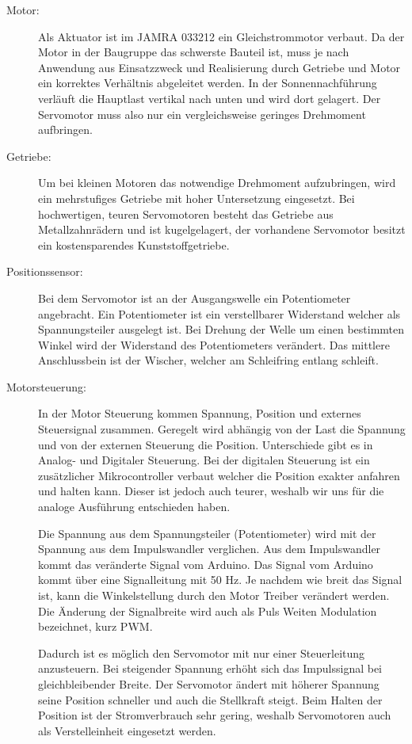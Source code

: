 \begin{description}
  \item[Motor:] Als Aktuator ist im JAMRA 033212 ein Gleichstrommotor verbaut. Da der Motor in der Baugruppe das schwerste Bauteil ist, muss je nach Anwendung aus Einsatzzweck und Realisierung durch Getriebe und Motor ein korrektes Verhältnis abgeleitet werden. In der Sonnennachführung verläuft die Hauptlast vertikal nach unten und wird dort gelagert. Der Servomotor muss also nur ein vergleichsweise geringes Drehmoment aufbringen.

  \item[Getriebe:] Um bei kleinen Motoren das notwendige Drehmoment aufzubringen, wird ein mehrstufiges Getriebe mit hoher Untersetzung eingesetzt. Bei hochwertigen, teuren Servomotoren besteht das Getriebe aus Metallzahnrädern und ist kugelgelagert, der vorhandene Servomotor besitzt ein kostensparendes Kunststoffgetriebe.

  \item[Positionssensor:] Bei dem Servomotor ist an der Ausgangswelle ein Potentiometer angebracht. Ein Potentiometer ist ein verstellbarer Widerstand welcher als Spannungsteiler ausgelegt ist.  Bei Drehung der Welle um einen bestimmten Winkel wird der Widerstand des Potentiometers verändert. Das mittlere Anschlussbein ist der Wischer, welcher am Schleifring entlang schleift. 

  \item [Motorsteuerung:] In der Motor Steuerung kommen Spannung, Position und externes Steuersignal zusammen. Geregelt wird abhängig von der Last die Spannung und von der externen Steuerung die Position. Unterschiede gibt es in Analog- und Digitaler Steuerung. Bei der digitalen Steuerung ist ein zusätzlicher Mikrocontroller verbaut welcher die Position exakter anfahren und halten kann. Dieser ist jedoch auch teurer, weshalb wir uns für die analoge Ausführung entschieden haben.
  
  Die Spannung aus dem Spannungsteiler (Potentiometer) wird mit der Spannung aus dem Impulswandler verglichen. Aus dem Impulswandler kommt das veränderte Signal vom Arduino. Das Signal vom Arduino kommt über eine Signalleitung mit 50 Hz. Je nachdem wie breit das Signal ist, kann die Winkelstellung durch den Motor Treiber verändert werden. Die Änderung der Signalbreite wird auch als Puls Weiten Modulation bezeichnet, kurz PWM. \cite{Dejan:2018,Ibrahim:2018}
  
  Dadurch ist es möglich den Servomotor mit nur einer Steuerleitung anzusteuern. Bei steigender Spannung erhöht sich das Impulssignal bei gleichbleibender Breite. Der Servomotor ändert mit höherer Spannung seine Position schneller und auch die Stellkraft steigt. Beim Halten der Position ist der Stromverbrauch sehr gering, weshalb Servomotoren auch als Verstelleinheit eingesetzt werden.


\end{description}
